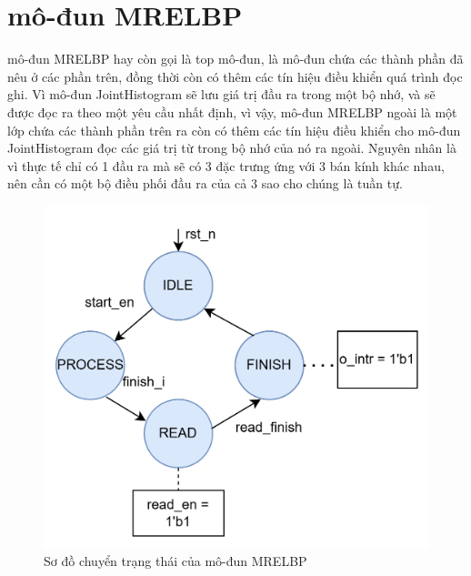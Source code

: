 \section{mô-đun MRELBP}
mô-đun MRELBP hay còn gọi là top mô-đun, là mô-đun chứa các thành phần đã nêu ở các phần trên, đồng thời còn có thêm các tín hiệu điều khiển quá trình đọc ghi. Vì mô-đun JointHistogram sẽ lưu giá trị đầu ra trong một bộ nhớ, và sẽ được đọc ra theo một yêu cầu nhất định, vì vậy, mô-đun MRELBP ngoài là một lớp chứa các thành phần trên ra còn có thêm các tín hiệu điều khiển cho mô-đun JointHistogram đọc các giá trị từ trong bộ nhớ của nó ra ngoài. Nguyên nhân là vì thực tế chỉ có 1 đầu ra mà sẽ có 3 đặc trưng ứng với 3 bán kính khác nhau, nên cần có một bộ điều phối đầu ra của cả 3 sao cho chúng là tuần tự. 

\begin{figure}[!ht]
	\centering
	\begin{minipage}[t]{0.48\linewidth}
		\centering
		\includegraphics[width=\linewidth]{figures/topTrans.png}
		\caption{Sơ đồ chuyển trạng thái của mô-đun MRELBP}
		\label{fig:topTrans}
	\end{minipage}
	\hfill
	\begin{minipage}[t]{0.48\linewidth}
		\centering

\end{minipage}
\end{figure}
